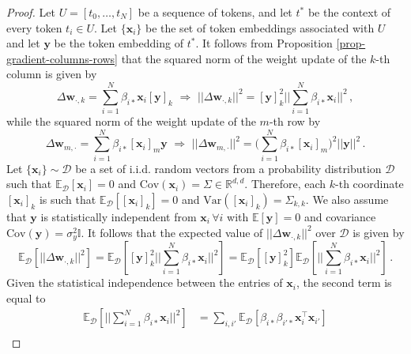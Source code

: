 \begin{proof}
%
%
Let $U = [t_0, \dots, t_N]$ be a sequence of tokens, and let $t^*$ be the context of every token $t_i \in U$. 
%
Let $\{\bm{x}_i\}$ be the set of token embeddings associated with $U$ and let $\bm{y}$ be the token embedding of $t^*$.
%
It follows from Proposition \ref{prop-gradient-columns-rows} that the squared norm of the weight update of the $k$-th column is given by 
%
%
\begin{equation}
\Delta \bm{w}_{\cdot, k}  =  \sum_{i=1}^N \beta_{i*}\bm{x}_i[\bm{y}]_k 
%
\,\,\Rightarrow \,\,
%
||\Delta \bm{w}_{\cdot, k}||^2 = [\bm{y}]^2_k ||  \sum_{i=1}^N \beta_{i*}\bm{x}_i||^2 \,,
\end{equation}
%
while the squared norm of the weight update of the $m$-th row by
%
%
\begin{equation}
\Delta \bm{w}_{m, \cdot}  = \sum_{i=1}^N \beta_{i*}[\bm{x}_i]_m\bm{y} 
%
\,\,\Rightarrow \,\,
%
||\Delta \bm{w}_{m, \cdot}||^2 = \big( \sum_{i=1}^N\beta_{i*}[\bm{x}_i]_m\big)^2 ||  \bm{y}||^2 \,.
\end{equation}
%
Let $\{\bm{x}_i\} \sim \mathcal{D}$ be a set of i.i.d. random vectors from a probability distribution $\mathcal{D}$ such that $\mathbb{E}_{\mathcal{D}}[\bm{x}_i] = 0$ and $\text{Cov}(\bm{x}_i) = \Sigma \in \mathbb{R}^{d,d}$.
%
Therefore, each $k$-th coordinate $[\bm{x}_i]_k$ is such that  $\mathbb{E}_{\mathcal{D}}[[\bm{x}_i]_k] = 0$ and $\text{Var}([\bm{x}_i]_k) = \Sigma_{k,k}$. 
%
We also assume that $\bm{y}$ is statistically independent from $\bm{x}_i \, \forall i$ with $\mathbb{E}[\bm{y}] = 0$ and covariance $\text{Cov}(\bm{y})  = \sigma_y^2\mathbb{I}$.
%
It follows that the expected value of $||\Delta \bm{w}_{\cdot, k}||^2$ over  $\mathcal{D}$ is given by
%
\begin{equation}
\mathbb{E}_{\mathcal{D}}\left[ ||\Delta \bm{w}_{\cdot, k}||^2 \right] 
= 
\mathbb{E}_{\mathcal{D}}\left[ [\bm{y}]^2_k || \sum_{i=1}^N \beta_{i*}\bm{x}_i||^2 \right]
= 
\mathbb{E}_{\mathcal{D}}\left[ [\bm{y}]^2_k \right] \mathbb{E}_{\mathcal{D}}\left[ ||  \sum_{i=1}^N \beta_{i*}\bm{x}_i||^2 \right] \,.
\end{equation}
%
Given the statistical independence between the entries of $\bm{x}_i$, the second term is equal to
%
\begin{equation}
\begin{split}
\mathbb{E}_{\mathcal{D}}\left[ || \sum_{i=1}^N \beta_{i*}\bm{x}_i||^2 \right]
& = \sum_{i,i'}\mathbb{E}_{\mathcal{D}}\left[ \beta_{i*}\beta_{i'*}\bm{x}^\top_{i}\bm{x}_{i'}\right]
\\

\end{split}
\end{equation}
\end{proof}

